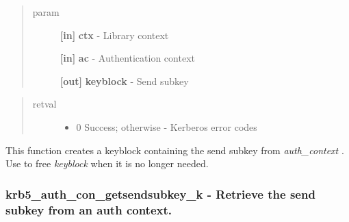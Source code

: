 \documentclass[letterpaper,10pt,english]{sphinxmanual}
\begin{document}
\begin{quote}\begin{description}
\item[{param}] \leavevmode
\textbf{{[}in{]}} \textbf{ctx} - Library context

\textbf{{[}in{]}} \textbf{ac} - Authentication context

\textbf{{[}out{]}} \textbf{keyblock} - Send subkey

\end{description}\end{quote}
\begin{quote}\begin{description}
\item[{retval}] \leavevmode\begin{itemize}
\item {} 
0   Success; otherwise - Kerberos error codes

\end{itemize}

\end{description}\end{quote}

This function creates a keyblock containing the send subkey from \emph{auth\_context} . Use {\hyperref[appdev/refs/api/krb5_free_keyblock:krb5_free_keyblock]{}} to free \emph{keyblock} when it is no longer needed.


\subsubsection{krb5\_auth\_con\_getsendsubkey\_k -  Retrieve the send subkey from an auth context.}
\label{appdev/refs/api/krb5_auth_con_getsendsubkey_k:krb5-auth-con-getsendsubkey-k-retrieve-the-send-subkey-from-an-auth-context}\label{appdev/refs/api/krb5_auth_con_getsendsubkey_k::doc}

\begin{fulllineitems}
\label{appdev/refs/api/krb5_auth_con_getsendsubkey_k:krb5_auth_con_getsendsubkey_k}
\end{fulllineitems}
\end{document}

